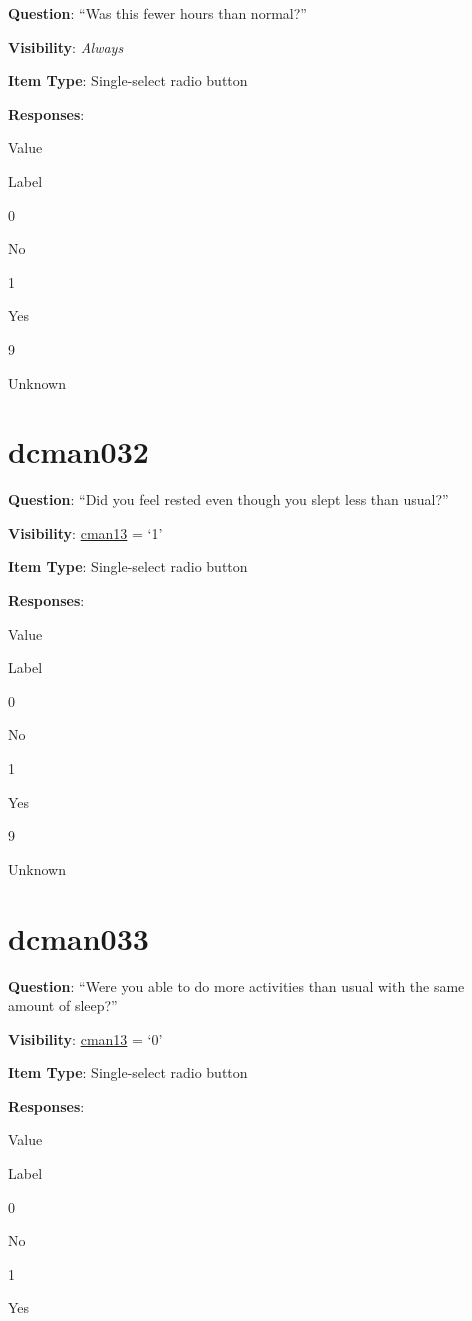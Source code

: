 \documentclass[]{book}
\begin{document}
\textbf{Question}: ``Was this fewer hours than normal?''

\textbf{Visibility}: \emph{Always}

\textbf{Item Type}: Single-select radio button

\textbf{Responses}:

Value

Label

0

No

1

Yes

9

Unknown

\hypertarget{dcman032}{%
\section{dcman032}\label{dcman032}}

\textbf{Question}: ``Did you feel rested even though you slept less than usual?''

\textbf{Visibility}: \protect\hyperlink{cman13}{cman13} = `1'

\textbf{Item Type}: Single-select radio button

\textbf{Responses}:

Value

Label

0

No

1

Yes

9

Unknown

\hypertarget{dcman033}{%
\section{dcman033}\label{dcman033}}

\textbf{Question}: ``Were you able to do more activities than usual with the same amount of sleep?''

\textbf{Visibility}: \protect\hyperlink{cman13}{cman13} = `0'

\textbf{Item Type}: Single-select radio button

\textbf{Responses}:

Value

Label

0

No

1

Yes
\end{document}
